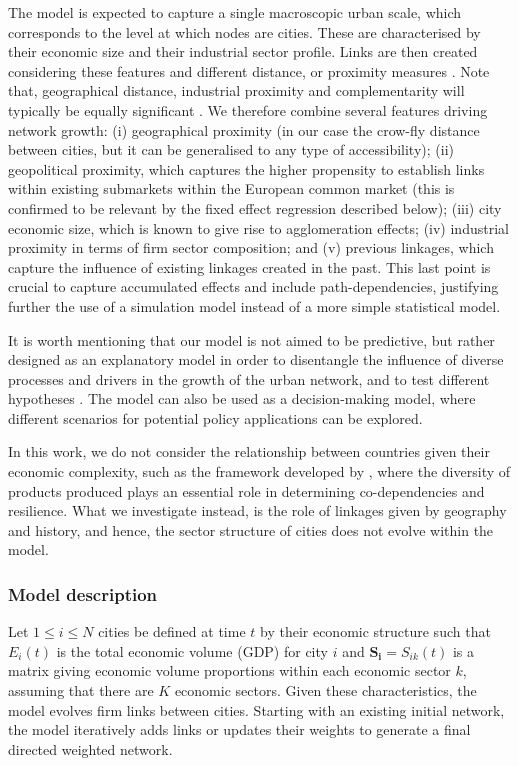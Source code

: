 \documentclass[10pt,letterpaper]{article}
\begin{document}
The model is expected to capture a single macroscopic urban scale, which corresponds to the level at which nodes are cities. These are characterised by their economic size and their industrial sector profile. Links are then created considering these features and different distance, or proximity measures \cite{martinus2018global}. Note that, geographical distance, industrial proximity and complementarity will typically be equally significant \cite{cottineau2020nested}. We therefore combine several features driving network growth: (i) geographical proximity (in our case the crow-fly distance between cities, but it can be generalised to any type of accessibility); (ii) geopolitical proximity, which captures the higher propensity to establish links within existing submarkets within the European common market (this is confirmed to be  relevant by the fixed effect regression described below); (iii) city economic size, which is known to give rise to agglomeration effects; (iv) industrial proximity in terms of firm sector composition; and (v) previous linkages, which capture the influence of existing linkages created in the past. This last point is crucial to capture accumulated effects and include path-dependencies, justifying further the use of a simulation model instead of a more simple statistical model.

It is worth mentioning that our model is not aimed to be predictive, but rather designed as an explanatory model in order to disentangle the influence of diverse processes and drivers in the growth of the urban network, and to test different hypotheses \cite{conte2012manifesto,varenne2018models}. The model can also be used as a decision-making model, where different scenarios for potential policy applications can be explored. 

In this work, we do not consider the relationship between countries given their economic complexity, such as the framework developed by  \cite{hidalgo2007product}, where the diversity of products produced plays an essential role in determining co-dependencies and resilience.
What we investigate instead, is the role of linkages given by geography and history, and hence, the sector structure of cities does not evolve within the model.


\subsubsection*{Model description}

Let $1 \leq i \leq N$ cities be defined at time $t$ by their economic structure such that $E_i(t)$ is the total economic volume (GDP) for city $i$ and $\mathbf{S_i} = S_{ik}(t)$ is a matrix giving economic volume proportions within each economic sector $k$, assuming that there are $K$ economic sectors. Given these characteristics, the model evolves firm links between cities. Starting with an existing initial network, the model iteratively adds links or updates their weights to generate a final directed weighted network.
\end{document}
